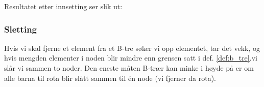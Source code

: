 \begin{example}
Resultatet etter innsetting ser slik ut:

\begin{figure}[H]
\centering
{}
\end{figure}
\end{example}



\subsubsection{Sletting}
Hvis vi skal fjerne et element fra et B-tre søker vi opp elementet, tar det vekk, og hvis mengden elementer i noden blir mindre enn grensen satt i def. \ref{def:b_tre}.vi slår vi sammen to noder. Den eneste måten B-trær kan minke i høyde på er om alle barna til rota blir slått sammen til én node (vi fjerner da rota). 

